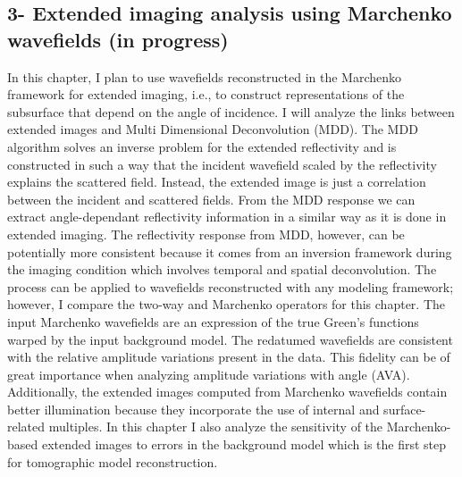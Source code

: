 \subsection{3- Extended imaging analysis  using Marchenko wavefields (in progress) }
In this chapter, I plan to use wavefields reconstructed in the Marchenko framework
for extended imaging, i.e., to construct representations of the subsurface that depend
on the angle of incidence. I will analyze the links between extended images and 
Multi Dimensional Deconvolution (MDD). The MDD algorithm solves an inverse problem 
for the extended reflectivity and is constructed in such a way that the incident wavefield
scaled by the reflectivity explains the scattered field. Instead, the extended
image is just a correlation between the incident and scattered fields.
 From the MDD response we can extract angle-dependant reflectivity information in 
a similar way as it is done in extended imaging.
 The reflectivity response from MDD, however, can be potentially more 
consistent because it comes from an inversion framework during the imaging condition which involves temporal and spatial
deconvolution. The process can be applied to wavefields reconstructed with
any modeling framework; however, I compare the two-way and Marchenko operators
for this chapter. 
 The input Marchenko wavefields are  an expression of the true 
Green's functions warped by the input background model. The redatumed wavefields are 
consistent with the relative amplitude variations present in the data. This fidelity
can be of great importance when analyzing amplitude variations with angle (AVA). Additionally, 
 the extended images computed from Marchenko wavefields contain better illumination because
they incorporate the use of internal and surface-related multiples. 
 In this chapter I also analyze the sensitivity of the Marchenko-based extended images
to errors in the background model which is the first step for tomographic model
reconstruction.


